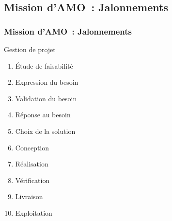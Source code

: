 \subsection{Mission d'AMO~: Jalonnements}
\begin{frame}
	\frametitle{Mission d'AMO~: Jalonnements}
	\begin{block}{Gestion de projet}
	\begin{enumerate}
		\item Étude de faisabilité\pause
		\item Expression du besoin\pause
		\item Validation du besoin\pause
		\item Réponse au besoin\pause
		\item Choix de la solution\pause
		\item Conception\pause
		\item Réalisation\pause
		\item Vérification\pause
		\item Livraison\pause
		\item Exploitation\pause
	\end{enumerate}
	\end{block}
\end{frame}

